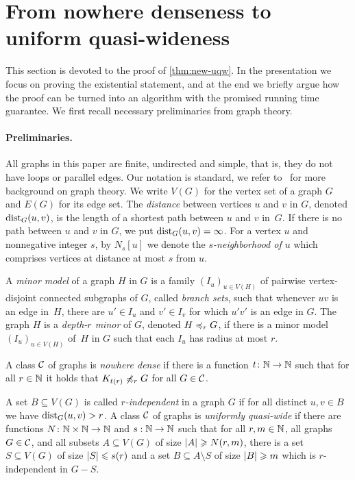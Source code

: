 \section{From nowhere denseness to uniform quasi-wideness}\label{sec:uqw}

This section is devoted to the proof of \cref{thm:new-uqw}. 
In the presentation we focus on proving the existential statement, and at the end we briefly argue how the proof can be turned into an algorithm with the promised running time guarantee.
We first recall necessary preliminaries from graph theory. 

\paragraph*{Preliminaries.}
All graphs in this paper are finite, undirected and simple, that is, 
they do not have loops or parallel edges. Our notation is standard,
we refer to~\cite{diestel2012graph} for more background on 
graph theory. 
We write $V(G)$ for the vertex set of a graph $G$ and
$E(G)$ for its edge set. 
The {\em{distance}} between vertices $u$ and $v$ in $G$, denoted $\mathrm{dist}_G(u,v)$, is the length of a shortest path between $u$ and $v$ in~$G$.
If there is no path between $u$ and $v$ in $G$, we put $\mathrm{dist}_G(u,v)=\infty$.
For a vertex $u$ and nonnegative integer $s$, by $N_s[u]$ we denote the {\em{$s$-neighborhood of $u$}} which comprises vertices at distance at most $s$ from $u$.

A {\em{minor model}} of a graph $H$ in $G$ is a family $(I_u)_{u\in V(H)}$ of pairwise vertex-disjoint connected subgraphs of $G$, called {\em{branch sets}},
such that whenever $uv$ is an edge in~$H$, there are $u'\in I_u$ and $v'\in I_v$ for which $u'v'$ 
is an edge in $G$.
The graph $H$ is a {\em{depth-$r$ minor}} of $G$, denoted $H\preccurlyeq_rG$, if there is a minor model
$(I_u)_{u\in V(H)}$ of~$H$ in $G$ such that each $I_u$ has radius at most $r$.

A class $\mathcal{C}$ of graphs is \emph{nowhere dense} if there is a function 
$t\colon \mathbb{N}\rightarrow \mathbb{N}$ such that for all $r\in \mathbb{N}$ it holds that $K_{t(r)}\not\preccurlyeq_r G$
for all $G\in \mathcal{C}$. 

A set $B\subseteq V(G)$ is called {\em{$r$-independent}} in a graph $G$ if for all
distinct $u,v\in B$ we have $\mathrm{dist}_G(u,v)>r$.
A class $\mathcal{C}$ of graphs is \emph{uniformly quasi-wide} if there are
functions $N\colon \mathbb{N}\times\mathbb{N}\rightarrow \mathbb{N}$ and $s:\mathbb{N}\rightarrow \mathbb{N}$ such
that for all $r,m\in \mathbb{N}$, all graphs $G\in \mathcal{C}$, and all subsets $A\subseteq V(G)$ of size $\left\lvert A\right\rvert\geqslant N(r,m)$, there is a set
$S\subseteq V(G)$ of size $\left\lvert S\right\rvert\leqslant s(r)$ and a set
$B\subseteq A\setminus S$ of size $\left\lvert B\right\rvert\geqslant m$ which is $r$-independent in
$G-S$. 



